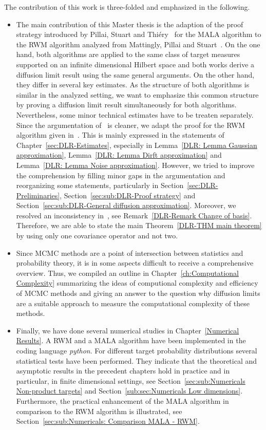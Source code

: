 The contribution of this work is three-folded and emphasized in the following.
\begin{itemize}
 \item The main contribution of this Master thesis is the adaption of the proof strategy introduced by Pillai, Stuart and Thi\'{e}ry~\autocite{Pillai2012} for the MALA algorithm to the RWM algorithm analyzed from Mattingly, Pillai and Stuart~\autocite{Mattingly2010}. On the one hand, both algorithms are applied to the same class of target measures supported on an infinite dimensional Hilbert space and both works derive a diffusion limit result using the same general arguments. On the other hand, they differ in several key estimates. As the structure of both algorithms is similar in the analyzed setting, we want to emphasize this common structure by proving a diffusion limit result simultaneously for both algorithms. Nevertheless, some minor technical estimates have to be treaten separately. Since the argumentation of~\autocite{Pillai2012} is cleaner, we adapt the proof for the RWM algorithm given in~\autocite{Mattingly2010}. This is mainly expressed in the statements of Chapter~\ref{sec:DLR-Estimates}, especially in Lemma~\ref{DLR: Lemma Gaussian approximation}, Lemma~\ref{DLR: Lemma Dirft approximation} and Lemma~\ref{DLR: Lemma Noise approximation}. However, we tried to improve the comprehension by filling minor gaps in the argumentation and reorganizing some statements, particularly in Section~\ref{sec:DLR-Preliminaries}, Section~\ref{sec:sub:DLR-Proof strategy} and Section~\ref{sec:sub:DLR-General diffusion approximation}. Moreover, we resolved an inconsistency in~\autocite{Pillai2012}, see Remark~\ref{DLR-Remark Change of basis}. Therefore, we are able to state the main Theorem~\ref{DLR-THM main theorem} by using only one covariance operator and not two.
 \item Since MCMC methods are a point of intersection between statistics and probability theory, it is in some aspects difficult to receive a comprehensive overview. Thus, we compiled an outline in Chapter~\ref{ch:Computational Complexity} summarizing the ideas of computional complexity and efficiency of MCMC methods and giving an answer to the question why diffusion limits are a suitable approach to measure the computational complexity of these methods.
 \item Finally, we have done several numerical studies in Chapter~\ref{Numerical Results}. A RWM and a MALA algorithm have been implemented in the coding language \textit{python}. For different target probability distributions several statistical tests have been performed. They indicate that the theoretical and asymptotic results in the precedent chapters hold in practice and in particular, in finite dimensional settings, see Section~\ref{sec:sub:Numericals Non-product targets} and Section~\ref{sub:sec:Numericals Low dimensions}. Furthermore, the practical enhancement of the MALA algorithm in comparison to the RWM algorithm is illustrated, see Section~\ref{sec:sub:Numericals: Comparison MALA - RWM}.
\end{itemize}


